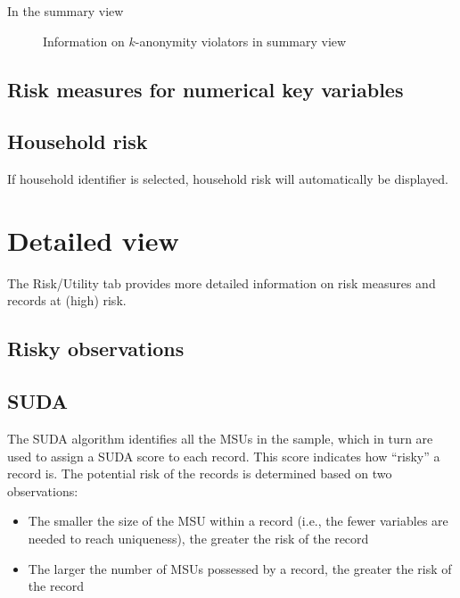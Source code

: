\documentclass[letterpaper,10pt,english]{sphinxmanual}
\begin{document}
In the summary view

\begin{figure}[htbp]
\centering
\capstart

\noindent{}
\caption{Information on \(k\)-anonymity violators in summary view}\label{\detokenize{risk:fig71}}\label{\detokenize{risk:id2}}\end{figure}


\subsection{Risk measures for numerical key variables}
\label{\detokenize{risk:risk-measures-for-numerical-key-variables}}

\subsection{Household risk}
\label{\detokenize{risk:household-risk}}
If household identifier is selected, household risk will automatically be displayed.


\section{Detailed view}
\label{\detokenize{risk:detailed-view}}
The Risk/Utility tab provides more detailed information on risk measures and records at
(high) risk.


\subsection{Risky observations}
\label{\detokenize{risk:risky-observations}}

\subsection{SUDA}
\label{\detokenize{risk:suda}}
The SUDA algorithm identifies all the MSUs in the sample, which in turn
are used to assign a SUDA score to each record. This score indicates how
“risky” a record is. The potential risk of the records is determined
based on two observations:
\begin{itemize}
\item {} 
The smaller the size of the MSU within a record (i.e., the fewer
variables are needed to reach uniqueness), the greater the risk of
the record

\item {} 
The larger the number of MSUs possessed by a record, the greater the
risk of the record

\end{itemize}
\end{document}
